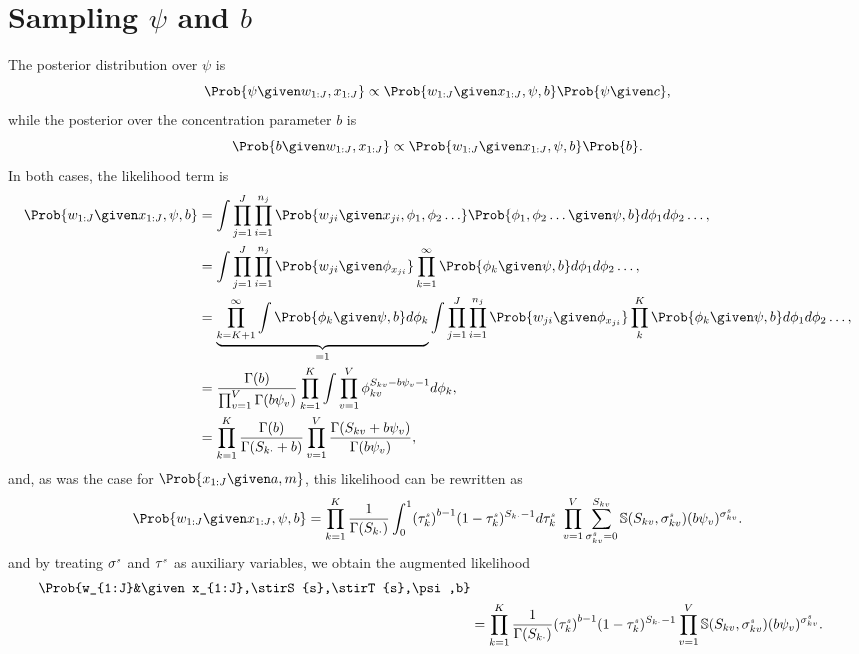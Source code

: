 \section{Sampling $\psi$ and $\mathit{b}$}
\newcommand{\phiseq}{\phi_1, \phi_2 \ldots}

The posterior distribution over $\psi$ is
\[
\Prob{\psi\given w_{1:J},x_{1:J}} \propto \Prob{w_{1:J}\given x_{1:J},\psi,b}\Prob{\psi\given c},
\]
while the posterior over the concentration parameter $b$ is
\[
\Prob{b\given w_{1:J},x_{1:J}} \propto \Prob{w_{1:J}\given x_{1:J},\psi,b}\Prob{b}.
\]
In both cases, the likelihood term is 
\begin{align*}
	\Prob{w_{1:J}\given x_{1:J},\psi,b}  
	&=
	\int
	\prod_{j=1}^J \prod_{i=1}^{n_j}
	\Prob{w_{ji} \given x_{ji}, \phiseq}
	\Prob{\phiseq \given \psi, b}
	d\phi_1 d\phi_2 \ldots,\\
	&=
	\int
	\prod_{j=1}^J \prod_{i=1}^{n_j}
	\Prob{w_{ji} \given \phi_{x_{ji}}}
		\prod_{k=1}^\infty \Prob{\phi_k \given \psi, b}
	d\phi_1 d\phi_2 \ldots,\\
	&=
	    \underbrace{
	    \prod_{k=K+1}^\infty \int\Prob{\phi_k \given \psi, b}d\phi_k
	    }_{=1}
	\int
		\prod_{j=1}^J \prod_{i=1}^{n_j} \Prob{w_{ji}\given \phi_{x_{ji}}}
		\prod_{k}^K \Prob{\phi_k \given \psi, b}
	d\phi_1 d\phi_2 \ldots,\\
	&=
	\frac{\Gamma(b)}{\prod_{v=1}^V\Gamma(b\psi_v)}
	\prod_{k=1}^K
	\int
	\prod_{v=1}^V
	\phi_{kv}^{S_{kv} - b\psi_v-1}d\phi_k,\\
	& = \prod_{k=1}^{K} \frac{\Gamma(b)}{\Gamma(S_{k\cdot}+b)} \prod_{v=1}^V \frac{\Gamma(S_{kv}+b\psi_v)}{\Gamma(b\psi_v)},
\end{align*}
and, as was the case for $\Prob{x_{1:J} \given a, m}$, this likelihood can be rewritten as 
\[
\Prob{w_{1:J}\given x_{1:J},\psi,b} 
= \prod_{k=1}^{K}
\frac{1}{\Gamma(S_{k\cdot})}\int_0^1\!{(\stirt{s}{k})}^{b-1} (1-\stirt{s}{k})^{S_{k\cdot}-1} d\stirt{s}{k}\ 
\prod_{v=1}^{V}\sum_{\stirs{s}{kv}=0}^{S_{kv}}\mathbb{S}(S_{kv},\stirs{s}{kv})(b\psi_v)^{\stirs{s}{kv}}.
\]
and by
treating $\sigma^{\text{\tiny{$s$}}}$ and $\tau^{\text{\tiny{$s$}}}$ as auxiliary variables, we obtain the augmented likelihood 
\[
	\begin{split}
		\Prob{w_{1:J}&\given x_{1:J},\stirS{s},\stirT{s},\psi,b} \\
		&= \prod_{k=1}^{K}\frac{1}{\Gamma(S_{k\cdot})} {(\stirt{s}{k})}^{b-1} (1-\stirt{s}{k})^{S_{k\cdot}-1} \prod_{v=1}^{V}\mathbb{S}(S_{kv},\stirs{s}{kv})(b\psi_v)^{\stirs{s}{kv}}.
	\end{split}
\]

